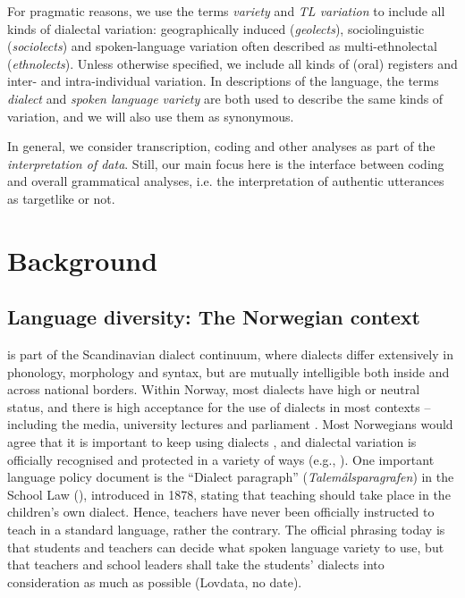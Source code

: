 \documentclass[output=paper,colorlinks,citecolor=brown,modfonts,nonflat]{../langscibook}
\begin{document}
For pragmatic reasons, we use the terms \textit{variety} and \textit{TL variation} to include all kinds of dialectal variation: geographically induced (\textit{geolects}), sociolinguistic (\textit{sociolects}) and spoken-language variation often described as multi-ethnolectal (\textit{ethnolects}). Unless otherwise specified, we include all kinds of (oral) registers and inter- and intra-individual variation. In descriptions of the  language, the terms \textit{dialect} and \textit{spoken language variety} are both used to describe the same kinds of variation, and we will also use them as synonymous.

In general, we consider transcription, coding and other analyses as part of the \textit{interpretation of data}. Still, our main focus here is the interface between coding and overall grammatical analyses, i.e. the interpretation of authentic utterances as targetlike or not.

\section{Background}\label{sec:emilsen:2}
\subsection{Language diversity: The Norwegian context}\label{sec:emilsen:2.1}

 is part of the Scandinavian dialect continuum, where dialects differ extensively in phonology, morphology and syntax, but are mutually intelligible both inside and across national borders. Within Norway, most dialects have high or neutral status, and there is high acceptance for the use of dialects in most contexts – including the media, university lectures and parliament \citep{Røyneland2009, Sandøy2011}. Most Norwegians would agree that it is important to keep using dialects \citep{Røyneland2009}, and dialectal variation is officially recognised and protected in a variety of ways (e.g., \citealt[31]{Trudgill2002}). One important language policy document is the ``Dialect paragraph'' (\textit{Talemålsparagrafen}) in the School Law (\citealt{LovdataND}), introduced in 1878, stating that teaching should take place in the children’s own dialect. Hence, teachers have never been officially instructed to teach in a standard language, rather the contrary. The official phrasing today is that students and teachers can decide what spoken language variety to use, but that teachers and school leaders shall take the students’ dialects into consideration as much as possible (Lovdata, no date).
\end{document}
